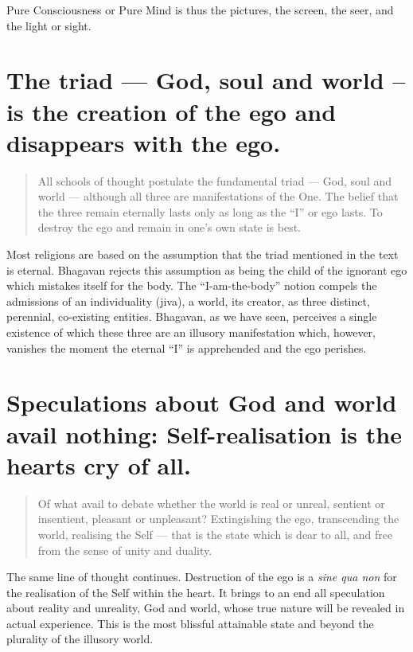 \documentclass[12pt]{report}
\begin{document}
Pure Consciousness or Pure Mind is thus the pictures, the screen, the
seer, and the light or sight.

\section{ The triad --- God, soul and world -- is the creation of
  the ego and disappears with the ego.}

\begin{quote}
  All schools of thought postulate the fundamental triad --- God, soul
  and world --- although all three are manifestations of the One. The
  belief that the three remain eternally lasts only as long as the ``I''
  or ego lasts. To destroy the ego and remain in one's own state is best.
\end{quote}


Most religions are based on the assumption that the triad mentioned in
the text is eternal. Bhagavan rejects this assumption as being the
child of the ignorant ego which mistakes itself for the body. The
``I-am-the-body'' notion compels the admissions of an individuality
(jiva), a world, its creator, as three distinct, perennial,
co-existing entities. Bhagavan, as we have seen, perceives a single
existence of which these three are an illusory manifestation which,
however, vanishes the moment the eternal ``I'' is apprehended and the
ego perishes.

\section{ Speculations about God and world avail nothing:
  Self-realisation is the hearts cry of all.}

\begin{quote}
  Of what avail to debate whether the world is real or unreal, sentient
  or insentient, pleasant or unpleasant? Extingishing the ego,
  transcending the world, realising the Self --- that is the state which
  is dear to all, and free from the sense of unity and duality.
\end{quote}


The same line of thought continues. Destruction of the ego is a
\emph{sine qua non} for the realisation of the Self within the
heart. It brings to an end all speculation about reality and
unreality, God and world, whose true nature will be revealed in actual
experience. This is the most blissful attainable state and beyond the
plurality of the illusory world.
\end{document}
